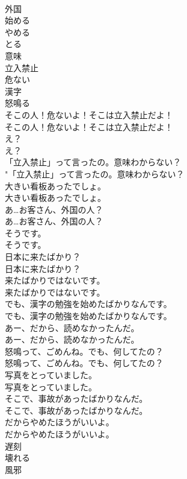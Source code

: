 \documentclass[8pt]{extreport}
\begin{document}
\begin{CJK}{UTF8}{min}
\\	外国
\\	始める
\\	やめる
\\	とる
\\	意味
\\	立入禁止
\\	危ない
\\	漢字
\\	怒鳴る
\\	そこの人！危ないよ！そこは立入禁止だよ！	
\\	そこの人！危ないよ！そこは立入禁止だよ！ 
\\	え？	
\\	え？ 
\\	「立入禁止」って言ったの。意味わからない？	
\\	"「立入禁止」って言ったの。意味わからない？ 
\\	大きい看板あったでしょ。	
\\	大きい看板あったでしょ。 
\\	あ…お客さん、外国の人？	
\\	あ…お客さん、外国の人？ 
\\	そうです。	
\\	そうです。 
\\	日本に来たばかり？	
\\	日本に来たばかり？ 
\\	来たばかりではないです。	
\\	来たばかりではないです。 
\\	でも、漢字の勉強を始めたばかりなんです。	
\\	でも、漢字の勉強を始めたばかりなんです。 
\\	あー、だから、読めなかったんだ。	
\\	あー、だから、読めなかったんだ。 
\\	怒鳴って、ごめんね。でも、何してたの？	
\\	怒鳴って、ごめんね。でも、何してたの？ 
\\	写真をとっていました。	
\\	写真をとっていました。 
\\	そこで、事故があったばかりなんだ。	
\\	そこで、事故があったばかりなんだ。 
\\	だからやめたほうがいいよ。	
\\	だからやめたほうがいいよ。 
\\	遅刻
\\	壊れる
\\	風邪

\end{CJK}
\end{document}
